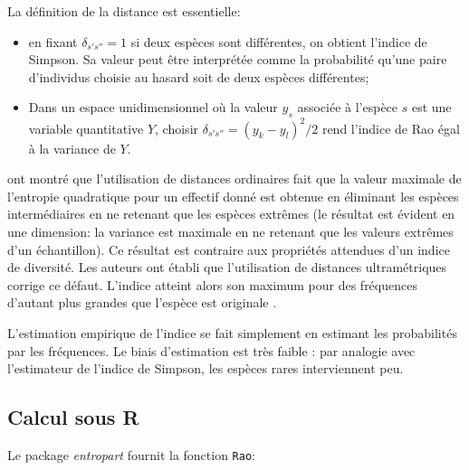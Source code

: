 \documentclass[
  11pt,
  french,
  a4paper,
  extrafontsizes,onecolumn,openright
  ]{memoir}
\newenvironment{Shaded}{\begin{snugshade}}{\end{snugshade}}
\newcommand{\CommentTok}[1]{\textcolor[rgb]{0.56,0.35,0.01}{\textit{#1}}}
\newcommand{\KeywordTok}[1]{\textcolor[rgb]{0.13,0.29,0.53}{\textbf{#1}}}
\newcommand{\NormalTok}[1]{#1}
\newcommand{\OperatorTok}[1]{\textcolor[rgb]{0.81,0.36,0.00}{\textbf{#1}}}
\newcommand{\StringTok}[1]{\textcolor[rgb]{0.31,0.60,0.02}{#1}}
\providecommand{\tightlist}{%
  \setlength{\itemsep}{0pt}\setlength{\parskip}{0pt}}
\begin{document}
La définition de la distance est essentielle:

\begin{itemize}
\tightlist
\item
  en fixant \(\delta_{s's''}=1\) si deux espèces sont différentes, on obtient l'indice de Simpson.
  Sa valeur peut être interprétée comme la probabilité qu'une paire d'individus choisie au hasard soit de deux espèces différentes;
\item
  Dans un espace unidimensionnel où la valeur \(y_s\) associée à l'espèce \(s\) est une variable quantitative \(Y\), choisir \(\delta_{s's''}={{\left(y_k-y_l\right)}^2}/{2}\) rend l'indice de Rao égal à la variance de \(Y\).
\end{itemize}

\textcite{Pavoine2005c} ont montré que l'utilisation de distances ordinaires fait que la valeur maximale de l'entropie quadratique pour un effectif donné est obtenue en éliminant les espèces intermédiaires en ne retenant que les espèces extrêmes (le résultat est évident en une dimension: la variance est maximale en ne retenant que les valeurs extrêmes d'un échantillon).
Ce résultat est contraire aux propriétés attendues d'un indice de diversité.
Les auteurs ont établi que l'utilisation de distances ultramétriques corrige ce défaut.
L'indice atteint alors son maximum pour des fréquences d'autant plus grandes que l'espèce est originale \autocite{Pavoine2005a}.

L'estimation empirique de l'indice se fait simplement en estimant les probabilités par les fréquences.
Le biais d'estimation est très faible \autocite{Marcon2014a}: par analogie avec l'estimateur de l'indice de Simpson, les espèces rares interviennent peu.

\hypertarget{calcul-sous-r}{%
\subsection{Calcul sous R}\label{calcul-sous-r}}

Le package \emph{entropart} fournit la fonction \texttt{Rao}:

\scriptsize

\begin{Shaded}
\end{Shaded}
\end{document}
